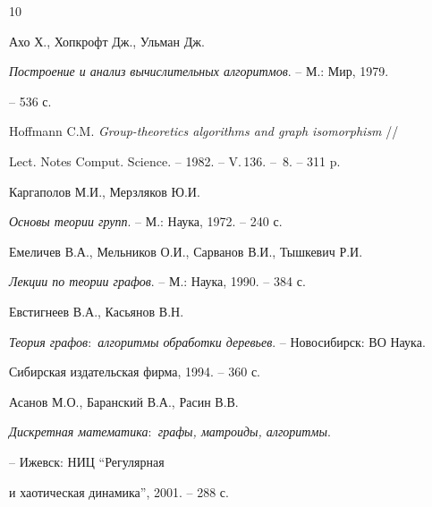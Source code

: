 \begin{thebibliography}{10}




Ахо Х., Хопкрофт Дж., Ульман Дж.


{\em Построение и анализ вычислительных алгоритмов}. -- М.: Мир, 1979.


-- 536 с.




Hoffmann C.M. {\em Group-theoretics algorithms and graph isomorphism} //


Lect. Notes Comput. Science. -- 1982. -- V.\,136. -- \No\,8. -- 311 p.




Каргаполов М.И., Мерзляков Ю.И.


{\em Основы теории групп}. -- М.: Наука, 1972. -- 240 с.




Емеличев В.А., Мельников О.И., Сарванов В.И., Тышкевич Р.И.


{\em Лекции по теории графов}. -- М.: Наука, 1990. -- 384 с.




Евстигнеев В.А., Касьянов В.Н.


{\em Теория графов$:$ алгоритмы обработки деревьев}. -- Новосибирск: ВО Наука.


Сибирская издательская фирма, 1994. -- 360 с.




Асанов М.О., Баранский В.А., Расин В.В.


{\em Дискретная математика$:$ графы, матроиды, алгоритмы}.


-- Ижевск: НИЦ ``Регулярная


и хаотическая динамика'', 2001. -- 288 с.





\end{thebibliography}





\vskip 0.5cm












\label{end}





